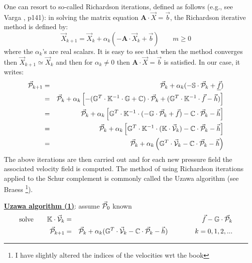One can resort to so-called Richardson iterations, defined as follows 
(e.g., see Varga \cite{varga}, p141):
in solving the matrix equation ${\bm A}\cdot {\vec X}={\vec b}$,
the Richardson iterative method is defined by: 
\begin{equation}
{\vec X}_{k+1} = {\vec X}_k + \alpha_k (-{\bm A} \cdot {\vec X}_k + {\vec b})
\quad\quad
m\geq 0 
\end{equation}
where the $\alpha_k$'s are real scalars. 
It is easy to see that when the method converges then ${\vec X}_{k+1} \simeq {\vec X}_k$  and then 
for $\alpha_k\neq 0$ then ${\bm A}\cdot {\vec X}={\vec b}$ is satisfied. 
In our case, it writes:
\begin{eqnarray}
\vec {\cal P}_{k+1} 
&=& \vec {\cal P}_{k} + \alpha_k ( - {\mathbb{S}} \cdot \vec{\cal P}_{k}  +  \underline{\vec{f}}) \nonumber\\
&=& \vec {\cal P}_{k} + \alpha_k \left[ - ({\mathbb{G}}^T \cdot {\mathbb{K}}^{-1} \cdot {\mathbb{G}} + {\mathbb{C}})  \cdot \vec{\cal P}_{k} 
+  ({\mathbb{G}}^T \cdot {\mathbb{K}}^{-1} \cdot \vec{f} - \vec{h}   ) \right] \nonumber\\
&=& \vec {\cal P}_{k} + \alpha_k \left[ {\mathbb{G}}^T \cdot {\mathbb{K}}^{-1} \cdot ( - {\mathbb{G}} \cdot \vec{\cal P}_{k} + \vec{f}) 
-{\mathbb{C}} \cdot \vec{\cal P}_{k} - \vec{h} 
\right] \nonumber\\
&=& \vec {\cal P}_{k} + \alpha_k \left[ {\mathbb{G}}^T \cdot {\mathbb{K}}^{-1} \cdot ( {\mathbb{K}}\cdot \vec{\cal V}_k)
-{\mathbb{C}} \cdot \vec{\cal P}_{k}  - \vec{h} \right] \nonumber\\
&=& \vec {\cal P}_{k} + \alpha_k \left( {\mathbb{G}}^T \cdot \vec{\cal V}_k -{\mathbb{C}} \cdot \vec{\cal P}_{k} - \vec{h} \right) 
\end{eqnarray}
The above iterations are then carried out and for each new pressure field the associated velocity field 
is computed. The method of using Richardson iterations applied to the Schur complement 
is commonly called the Uzawa algorithm (see Braess \cite[p221]{braess}
\footnote{I have slightly 
altered the indices of the velocities wrt the book}).

\begin{mdframed}[backgroundcolor=blue!5]
\underline{\bf Uzawa algorithm (1)}: assume $\vec{\cal P}_0$ known
\begin{eqnarray}
\text{solve} \qquad \mathbb{K} \cdot \vec{\cal V}_k &=& \vec f - \mathbb{G}\cdot \vec {\cal P}_{k} \\
\vec{\cal P}_{k+1} &=& 
\vec{\cal P}_{k}  + \alpha_k (\mathbb{G}^T\cdot \vec{\cal V}_k  -{\mathbb{C}} \cdot \vec{\cal P}_{k} -\vec h)
\quad
\quad
\quad
\quad
k=0,1,2, ... \label{uzaa2}
\end{eqnarray}
\end{mdframed}


